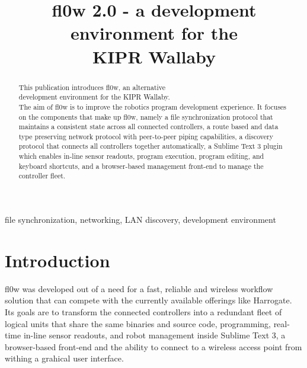 \documentclass[conference]{IEEEtran}
\begin{document}
\title{fl0w 2.0 - a development environment for the\\ KIPR Wallaby}
\author{
\and
{}
\and
{}
}

\maketitle


\begin{abstract}
This publication introduces fl0w, an alternative\\ development environment for the KIPR Wallaby.\\ The aim of fl0w is to improve the robotics program development experience. It focuses on the components that make up fl0w, namely a file synchronization protocol that maintains a consistent state across all connected controllers, a route based and data type preserving network protocol with peer-to-peer piping capabilities, a discovery protocol that connects all controllers together automatically, a Sublime Text 3\cite{Sublime Text 3:Sublime HQ} plugin which enables in-line sensor readouts, program execution, program editing, and keyboard shortcuts, and a browser-based management front-end to manage the controller fleet.\\
\end{abstract}

\begin{IEEEkeywords}
file synchronization, networking, LAN discovery, development environment
\end{IEEEkeywords}



\section{Introduction}
fl0w was developed out of a need for a fast, reliable and wireless workflow solution that can compete with the currently available offerings like Harrogate\cite{Harrogate:KIPR}. Its goals are to transform the connected controllers into a redundant fleet of logical units that share the same binaries and source code, programming, real-time in-line sensor readouts, and robot management inside Sublime Text 3\cite{Sublime Text 3:Sublime HQ}, a browser-based front-end and the ability to connect to a wireless access point from withing a grahical user interface.
\end{document}
